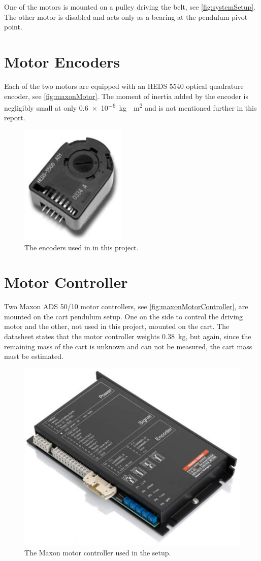 One of the motors is mounted on a pulley driving the belt, see \autoref{fig:systemSetup}. The other motor is disabled and acts only as a bearing at the pendulum pivot point.

\section{Motor Encoders}

Each of the two motors are equipped with an HEDS 5540 optical quadrature encoder, see \autoref{fig:maxonMotor}. The moment of inertia added by the encoder is negligibly small at only \SI{0.6e-6}{kg\cdot m^2} and is not mentioned further in this report.\cite{avagoTechnologies}
%
\begin{figure}[H]
  \includegraphics[width=.16\textwidth]{figures/infineonEncoderHEDS5540-A14}
  \caption{The encoders used in in this project. \cite{avagoTechnologies}}
  \label{fig:encoder}
\end{figure}

\section{Motor Controller}
Two Maxon ADS 50/10 motor controllers, see \autoref{fig:maxonMotorController}, are mounted on the cart pendulum setup. One on the side to control the driving motor and the other, not used in this project, mounted on the cart. The datasheet states that the motor controller weights \SI{0.38}{kg}, but again, since the remaining mass of the cart is unknown and can not be measured, the cart mass must be estimated.\cite{maxonMotorController}
%
\begin{figure}[H]
  \includegraphics[width=.26\textwidth]{figures/maxonMotorController}
  \caption{The Maxon motor controller used in the setup.\cite{maxonMotorController}}
  \label{fig:maxonMotorController}
\end{figure}

